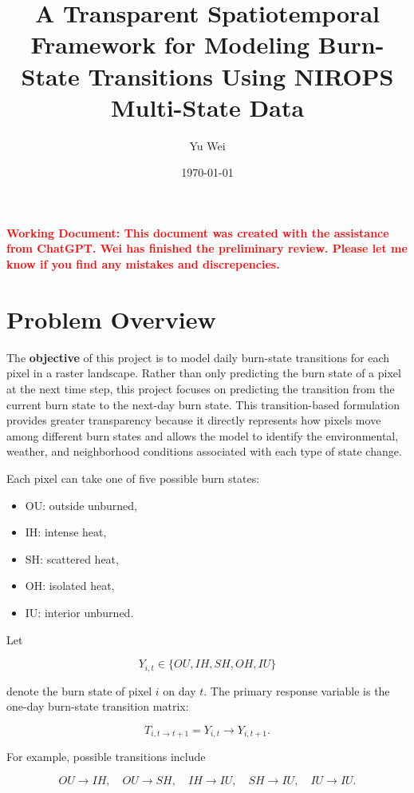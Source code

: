 \documentclass[11pt]{article}
\title{A Transparent Spatiotemporal Framework for Modeling Burn-State Transitions Using NIROPS Multi-State Data}
\author{Yu Wei}
\date{\today}
\begin{document}
\maketitle

\begin{center}
\textcolor{red}{\textbf{Working Document: This document was created with the assistance from ChatGPT.  Wei has finished the preliminary review. Please let me know if you find any mistakes and discrepencies.}}
\end{center}


\section{Problem Overview}

The \textbf{objective} of this project is to model daily burn-state transitions for each pixel in a raster landscape. Rather than only predicting the burn state of a pixel at the next time step, this project focuses on predicting the transition from the current burn state to the next-day burn state. This transition-based formulation provides greater transparency because it directly represents how pixels move among different burn states and allows the model to identify the environmental, weather, and neighborhood conditions associated with each type of state change.

Each pixel can take one of five possible burn states:

\begin{itemize}
    \item OU: outside unburned,
    \item IH: intense heat,
    \item SH: scattered heat,
    \item OH: isolated heat,
    \item IU: interior unburned.
\end{itemize}

Let

\[
Y_{i,t} \in \{OU, IH, SH, OH, IU\}
\]

denote the burn state of pixel $i$ on day $t$. The primary response variable is the one-day burn-state transition matrix:

\[
T_{i,t \rightarrow t+1} = Y_{i,t} \rightarrow Y_{i,t+1}.
\]

For example, possible transitions include

\[
OU \rightarrow IH, \quad
OU \rightarrow SH, \quad
IH \rightarrow IU, \quad
SH \rightarrow IU, \quad
IU \rightarrow IU.
\]
\end{document}

